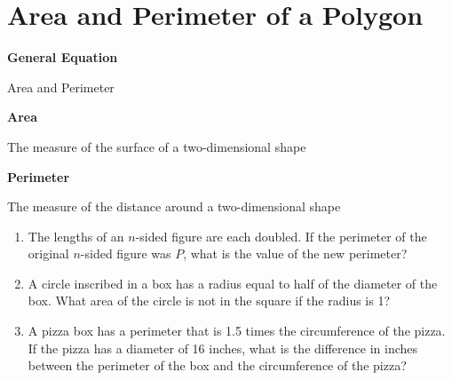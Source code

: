 \section{Area and Perimeter of a Polygon}
\textbf{General Equation}

\bigskip
\begin{equationbox}{Area and Perimeter}
\setlength{\columnseprule}{0pt}
\begin{center}
\begin{multicols}{2}
\textbf{Area}

The measure of the surface of a two-dimensional shape

\columnbreak
\textbf{Perimeter}

The measure of the distance around a two-dimensional shape
\end{multicols}
\end{center}
\end{equationbox}

\bigskip
\begin{enumerate}[labelindent=*,style=multiline,leftmargin=*,label=\textbf{Example \arabic*:}]
\item The lengths of an $n$-sided figure are each doubled. If the perimeter of the original $n$-sided figure was $P$, what is the value of the new perimeter?

\vfill\item A circle inscribed in a box has a radius equal to half of the diameter of the box. What area of the circle is not in the square if the radius is 1?

\vfill\item A pizza box has a perimeter that is 1.5 times the circumference of the pizza. If the pizza has a diameter of 16 inches, what is the difference in inches between the perimeter of the box and the circumference of the pizza?
\end{enumerate}


